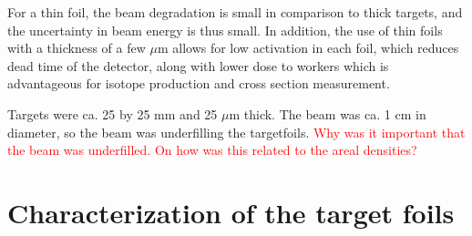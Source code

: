 For a thin foil, the beam degradation is small in comparison to thick targets, and the uncertainty in beam energy is thus small. In addition, the use of thin foils with a thickness of a few $\mu$m allows for low activation in each foil, which reduces dead time of the detector, along with lower dose to workers which is advantageous for isotope production and cross section measurement\cite{Qaim2017c}. \\

\noindent 

 
Targets were ca. 25 by 25 mm and 25 $\mu$m thick. The beam was ca. 1 cm in diameter, so the beam was underfilling the targetfoils. \textcolor{red}{Why was it important that the beam was underfilled. On how was this related to the areal densities?} 

\section{Characterization of the target foils} \label{subsec:target_design}


